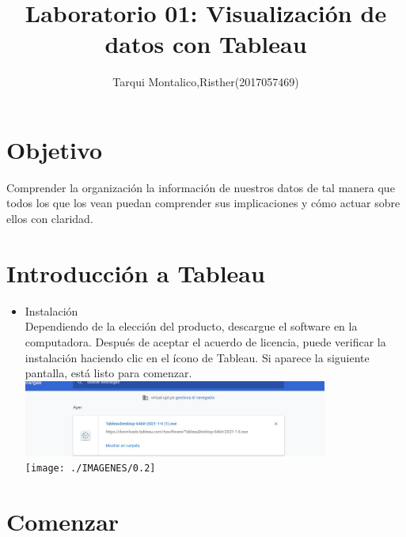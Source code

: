 \documentclass[preprint,12pt]{elsarticle}
\begin{document}
	
	\begin{frontmatter}

		\title{\huge  Laboratorio 01: Visualización de datos con
			Tableau }
		\author{	Tarqui Montalico,Risther(2017057469)}
		
		





\end{frontmatter}

\section{Objetivo}
	
	Comprender la organización la información de nuestros datos de tal manera que todos los que los vean
	puedan comprender sus implicaciones y cómo actuar sobre ellos con claridad.


\section{Introducción a Tableau}

	\begin{itemize}
	\item Instalación \\
	
		Dependiendo de la elección del producto, descargue el software en la computadora. Después de aceptar
		el acuerdo de licencia, puede verificar la instalación haciendo clic en el ícono de Tableau. Si aparece la
		siguiente pantalla, está listo para comenzar.
	 	\\	\includegraphics[width=10cm]{./IMAGENES/0.1}
	 	\\		\texttt{[image: ./IMAGENES/0.2]}
	\end{itemize}

\section{Comenzar}
	
\end{document}

